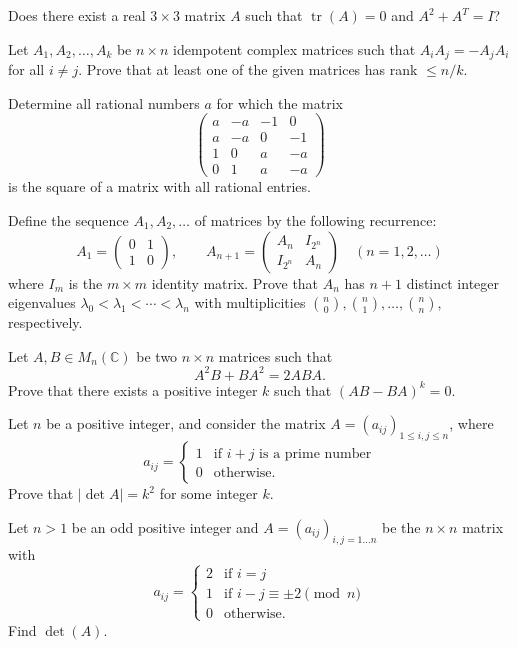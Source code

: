 \documentclass[12pt]{article}
\begin{document}
\begin{problems}
\item Does there exist a real $3\times 3$ matrix $A$ such that $\operatorname{tr}(A)=0$ and $A^2+A^T=I$?

\item Let $A_1,A_2,\dots,A_k$ be $n\times n$ idempotent complex matrices such that $A_iA_j=-A_jA_i$ for all $i\ne j$. Prove that at least one of the given matrices has rank $\le n/k$.

\item Determine all rational numbers $a$ for which the matrix
\[
\begin{pmatrix} a & -a & -1 & 0\\ a & -a & 0 & -1\\ 1 & 0 & a & -a\\ 0 & 1 & a & -a\end{pmatrix}
\]
is the square of a matrix with all rational entries.

\item Define the sequence $A_1,A_2,\dots$ of matrices by the following recurrence:
\[
A_1 = \begin{pmatrix}0 & 1\\ 1 & 0\end{pmatrix}, \qquad A_{n+1} = \begin{pmatrix} A_n & I_{2^n}\\ I_{2^n} & A_n\end{pmatrix} \quad (n=1,2,\dots)
\]
where $I_m$ is the $m\times m$ identity matrix. Prove that $A_n$ has $n+1$ distinct integer eigenvalues $\lambda_0<\lambda_1<\cdots<\lambda_n$ with multiplicities $\binom{n}{0},\binom{n}{1},\dots,\binom{n}{n}$, respectively.

\item Let $A,B\in M_n(\mathbb{C})$ be two $n\times n$ matrices such that
\[
A^2B+BA^2 = 2ABA.
\]
Prove that there exists a positive integer $k$ such that $(AB-BA)^k=0$.

\item Let $n$ be a positive integer, and consider the matrix $A=(a_{ij})_{1\le i,j\le n}$, where
\[
a_{ij} = \begin{cases} 1 & \text{if } i+j \text{ is a prime number}\\ 0 & \text{otherwise.}\end{cases}
\]
Prove that $|\det A| = k^2$ for some integer $k$.

\item Let $n>1$ be an odd positive integer and $A=(a_{ij})_{i,j=1\dots n}$ be the $n\times n$ matrix with
\[
a_{ij} = \begin{cases} 2 & \text{if } i=j\\ 1 & \text{if } i-j\equiv \pm 2 \pmod n\\ 0 & \text{otherwise.}\end{cases}
\]
Find $\det(A)$.


\end{problems}
\end{document}
